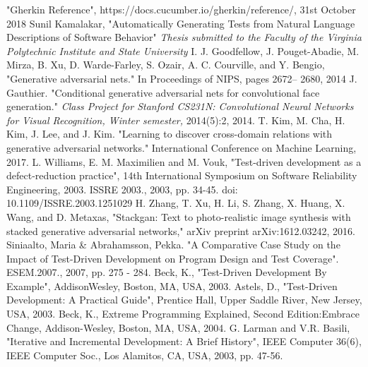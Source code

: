 \documentclass[conference]{IEEEtran}
\begin{document}
\begin{thebibliography}{00}
 "Gherkin Reference", https://docs.cucumber.io/gherkin/reference/, 31st October 2018
 Sunil Kamalakar, "Automatically Generating Tests from Natural Language Descriptions of Software Behavior" \textit{Thesis submitted to the Faculty of the
	Virginia Polytechnic Institute and State University
}
 I. J. Goodfellow, J. Pouget-Abadie, M. Mirza, B. Xu, D. Warde-Farley, S. Ozair, A. C.
Courville, and Y. Bengio, "Generative adversarial
nets." In Proceedings of NIPS, pages 2672–
2680, 2014
 J. Gauthier. "Conditional generative adversarial nets for
convolutional face generation." \textit{Class Project for Stanford
CS231N: Convolutional Neural Networks for Visual Recognition,
Winter semester,} 2014(5):2, 2014.
T. Kim, M. Cha, H. Kim, J. Lee, and J. Kim. "Learning to discover cross-domain relations with generative
adversarial networks." International Conference on Machine Learning, 2017.
 L. Williams, E. M. Maximilien and M. Vouk, "Test-driven development as a defect-reduction practice", 14th International Symposium on Software Reliability Engineering, 2003. ISSRE 2003., 2003, pp. 34-45.
doi: 10.1109/ISSRE.2003.1251029
 H. Zhang, T. Xu, H. Li, S. Zhang, X. Huang, X. Wang, and D. Metaxas,
"Stackgan: Text to photo-realistic image synthesis with stacked generative
adversarial networks," arXiv preprint arXiv:1612.03242, 2016.
Siniaalto, Maria \& Abrahamsson, Pekka. "A Comparative Case Study on the Impact of Test-Driven Development on Program Design and Test Coverage". ESEM.2007., 2007, pp. 275 - 284.
Beck, K., "Test-Driven Development By Example", AddisonWesley,
Boston, MA, USA, 2003.
Astels, D., "Test-Driven Development: A Practical Guide",
Prentice Hall, Upper Saddle River, New Jersey, USA, 2003.
Beck, K., Extreme Programming Explained, Second Edition:Embrace Change, Addison-Wesley, Boston, MA, USA, 2004.
G. Larman and V.R. Basili, "Iterative and Incremental Development: A Brief History", IEEE Computer 36(6), IEEE Computer Soc., Los Alamitos, CA, USA, 2003, pp. 47-56.
\end{thebibliography}
\vspace{12pt}
\end{document}
